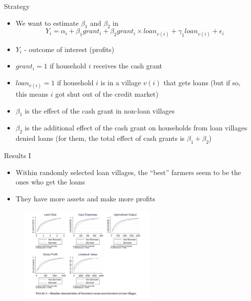 \documentclass[11pt,notes=hide,aspectratio=169,mathserif]{beamer}
\begin{document}
\begin{frame}{Strategy}
\begin{itemize}
    \item We want to estimate $\beta_1$ and $\beta_2$ in
    \begin{equation*}
        Y_i = \alpha_i + \beta_1 grant_i + \beta_2 grant_i\times loan_{v(i)}+ \gamma_1 loan_{v(i)} + \epsilon_i
    \end{equation*}
    \item $Y_i$ - outcome of interest (profits)
    \item $grant_i = 1$ if household $i$ receives the cash grant
    \item $loan_{v(i)} = 1$ if household $i$ is in a village $v(i)$ that gets loans (but if so, this means $i$ got shut out of the credit market)
    \item $\beta_1$ is the effect of the cash grant in non-loan villages
    \item $\beta_2$ is the additional effect of the cash grant on households from loan villages denied loans (for them, the total effect of cash grants is $\beta_1+\beta_2$)
\end{itemize}
\end{frame}



\begin{frame}{Results I}
\begin{itemize}
    \item Within randomly selected loan villages, the ``best'' farmers seem to be the ones who get the loans
    \item They have more assets and make more profits 
\end{itemize}
\begin{figure}
    \centering
    \includegraphics[width=0.6\textwidth]{inputs/fig4.png}
\end{figure}
\end{frame}
\end{document}
